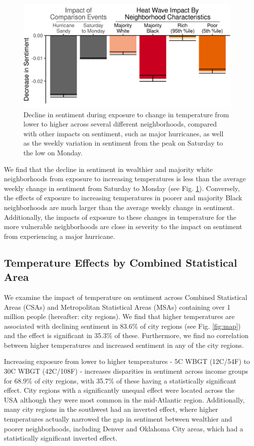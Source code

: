 \documentclass[fleqn,10pt]{wlscirep}
\begin{document}
\begin{figure}[H]
  \centering
  \includegraphics[width=0.66\linewidth]{../res/comparison_plot.png}
  \caption{Decline in sentiment during exposure to change in temperature from lower to higher across several different neighborhoods, compared with other impacts on sentiment, such as major hurricanes, as well as the weekly variation in sentiment from the peak on Saturday to the low on Monday.}
  \label{fig:compare}
\end{figure}

We find that the decline in sentiment in wealthier and majority white neighborhoods from exposure to increasing temperatures is less than the average weekly change in sentiment from Saturday to Monday (see Fig. \ref{fig:compare}). Conversely, the effects of exposure to increasing temperatures in poorer and majority Black neighborhoods are much larger than the average weekly change in sentiment. Additionally, the impacts of exposure to these changes in temperature for the more vulnerable neighborhoods are close in severity to the impact on sentiment from experiencing a major hurricane.

\subsection*{Temperature Effects by Combined Statistical Area}
We examine the impact of temperature on sentiment across Combined Statistical Areas (CSAs) and Metropolitan Statistical Areas (MSAs) containing over 1 million people (hereafter: city regions). We find that higher temperatures are associated with declining sentiment in 83.6\% of city regions (see Fig. \ref{fig:map}) and the effect is significant in 35.3\% of these. Furthermore, we find no correlation between higher temperatures and increased sentiment in any of the city regions.

Increasing exposure from lower to higher temperatures - 5\textdegree C WBGT (12\textdegree C/54\textdegree F) to 30\textdegree C WBGT (42\textdegree C/108\textdegree F) - increases disparities in sentiment across income groups for 68.9\% of city regions, with 35.7\% of these having a statistically significant effect. City regions with a significantly unequal effect were located across the USA although they were most common in the mid-Atlantic region. Additionally, many city regions in the southwest had an inverted effect, where higher temperatures actually narrowed the gap in sentiment between wealthier and poorer neighborhoods, including Denver and Oklahoma City areas, which had a statistically significant inverted effect.
\end{document}
